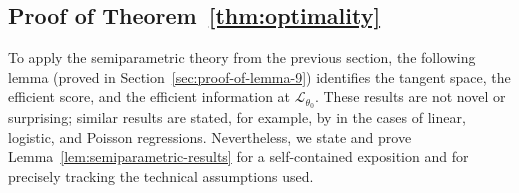\documentclass[aos]{imsart}
\theoremstyle{plain}
\theoremstyle{remark}
\newcommand{\law}{\mathcal L}							%
\begin{document}
\subsection{Proof of Theorem~\ref{thm:optimality}}  \label{sec:optimality-proof}

To apply the semiparametric theory from the previous section, the following lemma (proved in Section~\ref{sec:proof-of-lemma-9}) identifies the tangent space, the efficient score, and the efficient information at $\law_{\theta_0}$. These results are not novel or surprising; similar results are stated, for example, by \citet{Robins2001} in the cases of linear, logistic, and Poisson regressions. Nevertheless, we state and prove Lemma~\ref{lem:semiparametric-results} for a self-contained exposition and for precisely tracking the technical assumptions used. 
\end{document}
